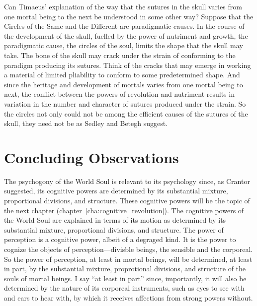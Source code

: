 Can Timaeus' explanation of the way that the sutures in the skull varies from one mortal being to the next be understood in some other way? Suppose that the Circles of the Same and the Different are paradigmatic causes. In the course of the development of the skull, fuelled by the power of nutriment and growth, the paradigmatic cause, the circles of the soul, limits the shape that the skull may take. The bone of the skull may crack under the strain of conforming to the paradigm producing its sutures. Think of the cracks that may emerge in working a material of limited pliability to conform to some predetermined shape. And since the heritage and development of mortals varies from one mortal being to next, the conflict between the powers of revolution and nutriment results in variation in the number and character of sutures produced under the strain. So the circles not only could not be among the efficient causes of the sutures of the skull, they need not be as Sedley and Betegh suggest.



\section{Concluding Observations} %
\label{sec:concluding_observations_p}

The psychogony of the World Soul is relevant to its psychology since, as Crantor suggested, its cognitive powers are determined by its substantial mixture, proportional divisions, and structure. These cognitive powers will be the topic of the next chapter (chapter~\ref{cha:cognitive_revolution}). The cognitive powers of the World Soul are explained in terms of its motion as determined by its substantial mixture, proportional divisions, and structure. The power of perception is a cognitive power, albeit of a degraged kind. It is the power to cognize the objects of perception---divisble beings, the sensible and the corporeal. So the power of perception, at least in mortal beings, will be determined, at least in part, by the substantial mixture, proprotional divisions, and structure of the souls of mortal beings. I say ``at least in part'' since, importantly, it will also be determined by the nature of its corporeal instruments, such as eyes to see with and ears to hear with, by which it receives affections from strong powers without.

